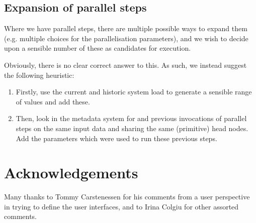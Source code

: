\documentclass[10pt,a4paper]{article}
\newcommand{\npar}{\par\noindent\space}
\begin{document}
\begin{appendices}
\subsection{Expansion of parallel steps}
\label{sec:expansionOfParallelSteps}
\npar Where we have parallel steps, there are multiple possible ways to expand them (e.g. multiple choices for the parallelisation parameters), and we wish to decide upon a sensible number of these as candidates for execution.
\npar Obviously, there is no clear correct answer to this. As such, we instead suggest the following heuristic:
\begin{enumerate}
\item Firstly, use the current and historic system load to generate a sensible range of values and add these.
\item Then, look in the metadata system for and previous invocations of parallel steps on the same input data and sharing the same (primitive) head nodes. Add the parameters which were used to run these previous steps.
\end{enumerate}

\section*{Acknowledgements}
Many thanks to Tommy Carstenessen for his comments from a user perspective in trying to define the user interfaces, and to Irina Colgiu for other assorted comments.

\end{appendices}

\printglossaries
\end{document}
